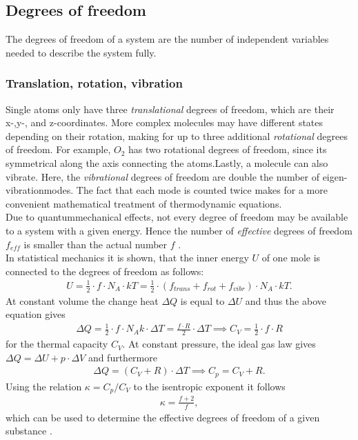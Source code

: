\documentclass{subfiles}
\begin{document}
    \subsection{Degrees of freedom}
        The degrees of freedom of a system are the number of independent variables needed to describe the system fully.

        \subsubsection*{Translation, rotation, vibration}
        Single atoms only have three \textit{translational} degrees of freedom, which are their x-,y-, and z-coordinates. More complex molecules may have different states depending on their rotation, making for up to three additional \textit{rotational} degrees of freedom. For example, $O_2$ has two rotational degrees of freedom, since its symmetrical along the axis connecting the atoms.Lastly, a molecule can also vibrate. Here, the \textit{vibrational} degrees of freedom are double the number of eigen-vibrationmodes. The fact that each mode is counted twice makes for a more convenient mathematical treatment of thermodynamic equations.\\

        \noindent Due to quantummechanical effects, not every degree of freedom may be available to a system with a given energy. Hence the number of \textit{effective} degrees of freedom $f_{eff}$ is smaller than the actual number $f$ \cite[p.75-76]{heintze}.\\

        \noindent In statistical mechanics it is shown, that the inner energy $U$ of one mole is connected to the degrees of freedom as follows:
        \begin{align*}
            U=\frac{1}{2}\cdot f\cdot N_A\cdot kT=\frac{1}{2}\cdot(f_{trans}+f_{rot}+f_{vibr})\cdot N_A\cdot kT.
        \end{align*}
        At constant volume the change heat $\Delta Q$ is equal to $\Delta U$ and thus the above equation gives
        \begin{align*}
            \Delta Q=\frac{1}{2}\cdot f\cdot N_Ak\cdot\Delta T=\frac{f\cdot R}{2}\cdot\Delta T\implies C_V=\frac{1}{2}\cdot f\cdot R
        \end{align*}
        for the thermal capacity $C_V$. At constant pressure, the ideal gas law gives $\Delta Q=\Delta U+p\cdot\Delta V$ and furthermore
        \begin{align*}
            \Delta Q=(C_V+R)\cdot\Delta T\implies C_p=C_V+R.
        \end{align*}
        Using the relation $\kappa=C_p/C_V$ to the isentropic exponent it follows
        \begin{align*}
            \kappa=\frac{f+2}{f},
        \end{align*}
        which can be used to determine the effective degrees of freedom of a given substance \cite[p.296-297]{demtroeder1.9}.
\end{document}
